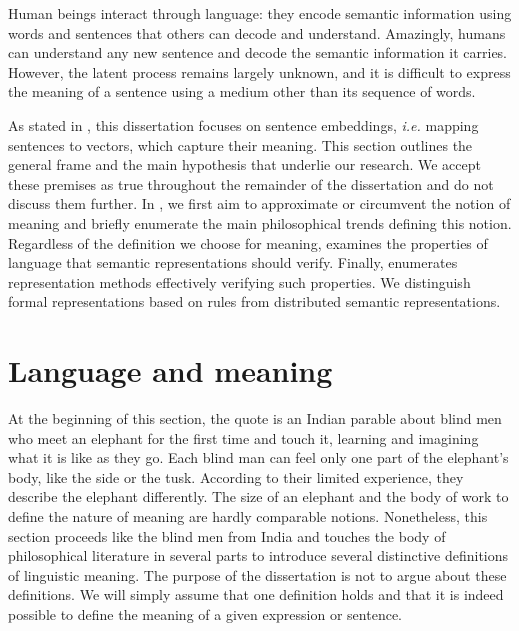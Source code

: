 Human beings interact through language: they encode semantic information using words and sentences that others can decode and understand. Amazingly, humans can understand any new sentence and decode the semantic information it carries. However, the latent process remains largely unknown, and it is difficult to express the meaning of a sentence using a medium other than its sequence of words.%

As stated in , this dissertation focuses on sentence embeddings, \textit{i.e.} mapping sentences to vectors, which capture their meaning. This section outlines the general frame and the main hypothesis that underlie our research. We accept these premises as true throughout the remainder of the dissertation and do not discuss them further. In , we first aim to approximate or circumvent the notion of meaning and briefly enumerate the main philosophical trends defining this notion. Regardless of the definition we choose for meaning,  examines the properties of language that semantic representations should verify. Finally,  enumerates representation methods effectively verifying such properties. We distinguish formal representations based on rules from distributed semantic representations.

\section{Language and meaning}

At the beginning of this section, the quote is an Indian parable about blind men who meet an elephant for the first time and touch it, learning and imagining what it is like as they go. Each blind man can feel only one part of the elephant's body, like the side or the tusk. According to their limited experience, they describe the elephant differently. The size of an elephant and the body of work to define the nature of meaning are hardly comparable notions. Nonetheless, this section proceeds like the blind men from India and touches the body of philosophical literature in several parts to introduce several distinctive definitions of linguistic meaning. The purpose of the dissertation is not to argue about these definitions. We will simply assume that one definition holds and that it is indeed possible to define the meaning of a given expression or sentence. 

